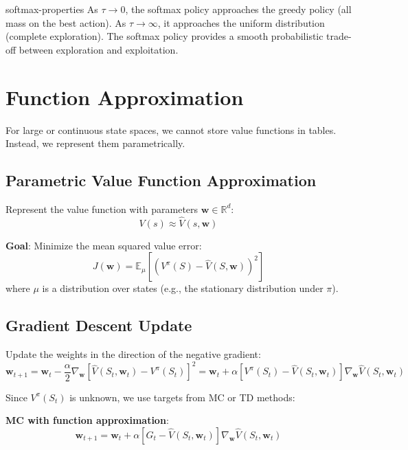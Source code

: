 \documentclass[a4paper, 11pt]{article}
\numberwithin{equation}{section}
\theoremstyle{plain}
\theoremstyle{definition}
\newcommand{\E}{{\mathbb E}}
\newcommand{\1}{{\mathbbm 1}}
\newcommand{\mb}[1]{\mathbf{#1}}
\newcommand{\R}{{\mathbb{R}}}
\begin{document}
	\begin{frema}{}{softmax-properties}
		As $\tau \to 0$, the softmax policy approaches the greedy policy (all mass on the best action). As $\tau \to \infty$, it approaches the uniform distribution (complete exploration). The softmax policy provides a smooth probabilistic trade-off between exploration and exploitation.
	\end{frema}
	
	\section{Function Approximation}
	
	For large or continuous state spaces, we cannot store value functions in tables. Instead, we represent them parametrically.
	
	\subsection{Parametric Value Function Approximation}
	
	Represent the value function with parameters $\mb{w} \in \R^d$:
	\begin{equation}
		V(s) \approx \hat{V}(s, \mb{w})
	\end{equation}
	
	\textbf{Goal}: Minimize the mean squared value error:
	\begin{equation}
		J(\mb{w}) = \E_{\mu}\left[(V^{\pi}(S) - \hat{V}(S, \mb{w}))^2\right]
	\end{equation}
	where $\mu$ is a distribution over states (e.g., the stationary distribution under $\pi$).
	
	\subsection{Gradient Descent Update}
	
	Update the weights in the direction of the negative gradient:
	\begin{equation}\label{gd-update}
		\mb{w}_{t+1} = \mb{w}_t - \frac{\alpha}{2} \nabla_{\mb{w}} \left[\hat{V}(S_t, \mb{w}_t) - V^{\pi}(S_t)\right]^2 = \mb{w}_t + \alpha [V^{\pi}(S_t) - \hat{V}(S_t, \mb{w}_t)] \nabla_{\mb{w}} \hat{V}(S_t, \mb{w}_t)
	\end{equation}
	
	Since $V^{\pi}(S_t)$ is unknown, we use targets from MC or TD methods:
	
	\textbf{MC with function approximation}:
	\begin{equation}
		\mb{w}_{t+1} = \mb{w}_t + \alpha [G_t - \hat{V}(S_t, \mb{w}_t)] \nabla_{\mb{w}} \hat{V}(S_t, \mb{w}_t)
	\end{equation}
	
\end{document}
